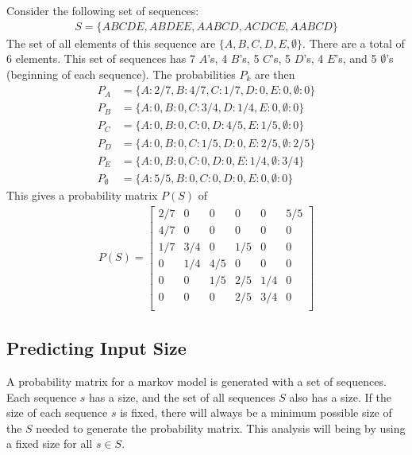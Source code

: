 Consider the following set of sequences:
\begin{align}
	S=\{ABCDE, ABDEE, AABCD, ACDCE, AABCD\} \label{markov-model-larger-example-sequences}
\end{align}
The set of all elements of this sequence are $\{A, B, C, D, E, \emptyset\}$. There are a total of 6 elements. This set of sequences has 7 $A$'s, 4 $B$'s, 5 $C$'s, 5 $D$'s, 4 $E$'s, and 5 $\emptyset$'s (beginning of each sequence). The probabilities $P_k$ are then
\begin{align}
	P_A &= \{A:2/7, B:4/7, C:1/7, D:0, E:0, \emptyset:0 \} \\
	P_B &= \{A:0, B:0, C:3/4, D:1/4, E:0, \emptyset:0 \} \\
	P_C &= \{A:0, B:0, C:0, D:4/5, E:1/5, \emptyset:0 \} \\
	P_D &= \{A:0, B:0, C:1/5, D:0, E:2/5, \emptyset:2/5 \} \\
	P_E &= \{A:0, B:0, C:0, D:0, E:1/4, \emptyset:3/4 \} \\
	P_\emptyset &= \{A:5/5, B:0, C:0, D:0, E:0, \emptyset: 0\} 
\end{align}
This gives a probability matrix $P(S)$ of
\begin{align}
	P(S) = \left[\begin{matrix}
		2/7 & 0 & 0 & 0 & 0 & 5/5 \\
		4/7 & 0 & 0 & 0 & 0 &  0 \\
		1/7 & 3/4 & 0 & 1/5 & 0 & 0 \\
		0 & 1/4 & 4/5 & 0 & 0 & 0 \\
		0 & 0 & 1/5 & 2/5 & 1/4 & 0 \\
		0 & 0 & 0 & 2/5 & 3/4 & 0 \\
	\end{matrix}\right] \label{markov-model-larger-example-probability-matrix}
\end{align}










\subsection{Predicting Input Size}

A probability matrix for a markov model is generated with a set of sequences. Each sequence $s$ has a size, and the set of all sequences $S$ also has a size. If the size of each sequence $s$ is fixed, there will always be a minimum possible size of the $S$ needed to generate the probability matrix. This analysis will being by using a fixed size for all $s\in S$.

